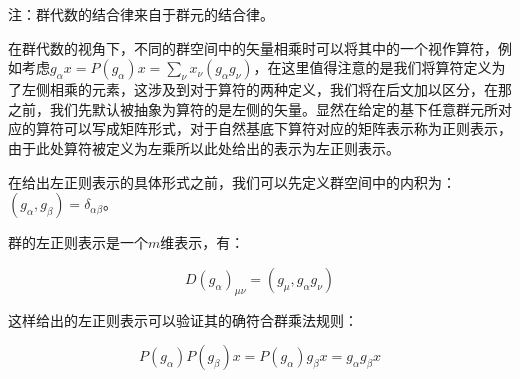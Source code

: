 注：群代数的结合律来自于群元的结合律。

在群代数的视角下，不同的群空间中的矢量相乘时可以将其中的一个视作算符，例如考虑$g_\alpha x=P(g_\alpha)x=\displaystyle\sum_\nu x_\nu (g_\alpha g_\nu)$，在这里值得注意的是我们将算符定义为了左侧相乘的元素，这涉及到对于算符的两种定义，我们将在后文加以区分，在那之前，我们先默认被抽象为算符的是左侧的矢量。显然在给定的基下任意群元所对应的算符可以写成矩阵形式，对于自然基底下算符对应的矩阵表示称为正则表示，由于此处算符被定义为左乘所以此处给出的表示为左正则表示。

在给出左正则表示的具体形式之前，我们可以先定义群空间中的内积为：$(g_\alpha,g_\beta)=\delta_{\alpha\beta}$。

群的左正则表示是一个$m$维表示，有：

$$D(g_\alpha)_{\mu\nu}=(g_\mu,g_\alpha g_\nu)$$

这样给出的左正则表示可以验证其的确符合群乘法规则：

$$P(g_\alpha)P(g_\beta)x=P(g_\alpha)g_\beta x=g_\alpha g_\beta x$$